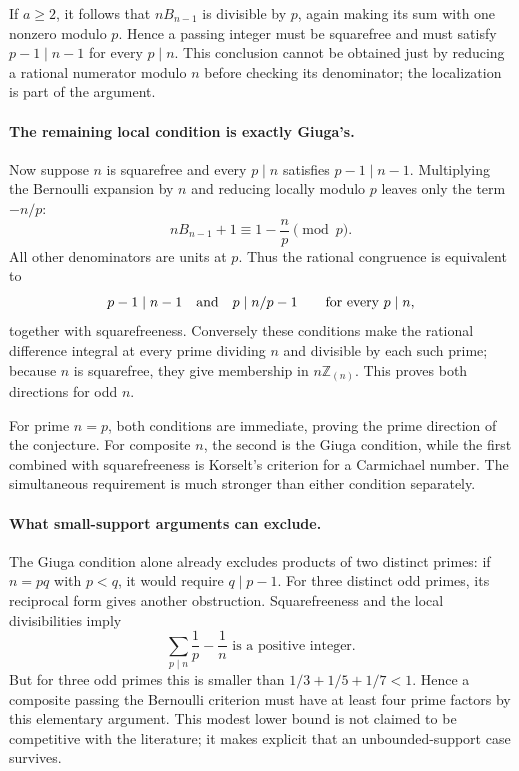 \documentclass[11pt,a4paper]{article}
\begin{document}
If $a\ge2$, it follows that $nB_{n-1}$ is divisible by $p$, again
making its sum with one nonzero modulo $p$. Hence a passing integer
must be squarefree and must satisfy $p-1\mid n-1$ for every $p\mid n$.
This conclusion cannot be obtained just by reducing a rational numerator
modulo $n$ before checking its denominator; the localization is part of
the argument.

\paragraph{The remaining local condition is exactly Giuga's.}
Now suppose $n$ is squarefree and every $p\mid n$ satisfies
$p-1\mid n-1$. Multiplying the Bernoulli expansion by $n$ and
reducing locally modulo $p$ leaves only the term $-n/p$:
\[
                         nB_{n-1}+1\equiv1-\frac np\pmod p.
\]
All other denominators are units at $p$. Thus the rational congruence
is equivalent to
\[
 p-1\mid n-1\quad\hbox{and}\quad p\mid n/p-1
                    \qquad\text{for every }p\mid n,
\]
together with squarefreeness. Conversely these conditions make the
rational difference integral at every prime dividing $n$ and divisible
by each such prime; because $n$ is squarefree, they give membership
in $n\mathbb Z_{(n)}$. This proves both directions for odd $n$.

For prime $n=p$, both conditions are immediate, proving the prime
direction of the conjecture. For composite $n$, the second is the
Giuga condition, while the first combined with squarefreeness is
Korselt's criterion for a Carmichael number. The simultaneous
requirement is much stronger than either condition separately.

\paragraph{What small-support arguments can exclude.}
The Giuga condition alone already excludes products of two distinct
primes: if $n=pq$ with $p<q$, it would require $q\mid p-1$.
For three distinct odd primes, its reciprocal form gives another
obstruction. Squarefreeness and the local divisibilities imply
\[
                   \sum_{p\mid n}\frac1p-\frac1n
                       \text{ is a positive integer}.
\]
But for three odd primes this is smaller than
$1/3+1/5+1/7<1$. Hence a composite passing the Bernoulli criterion
must have at least four prime factors by this elementary argument.
This modest lower bound is not claimed to be competitive with the
literature; it makes explicit that an unbounded-support case survives.
\end{document}
